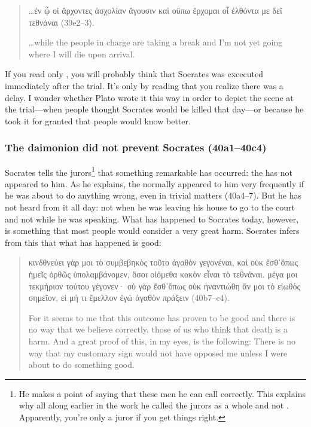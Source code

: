 \documentclass[11pt]{article}
\begin{document}
\begin{quote}
    \dots ἐν ᾧ οἱ ἄρχοντες ἀσχολίαν ἄγουσιν καὶ οὔπω ἔρχομαι οἷ ἐλθόντα με δεῖ τεθνάναι (39e2--3).

    \dots while the people in charge are taking a break and I'm not yet going where I will die upon arrival.
\end{quote}

If you read only , you will probably think that Socrates was excecuted immediately after the trial.  It's only by reading  that you realize there was a delay.  I wonder whether Plato wrote it this way in order to depict the scene at the trial---when people thought Socrates would be killed that day---or because he took it for granted that people would know better.

\subsubsection{The daimonion did not prevent Socrates (40a1--40c4)}

Socrates tells the jurors\footnote{He makes a point of saying that these men he can call  correctly.  This explains why all along earlier in the work he called the jurors as a whole  and not .  Apparently, you're only a juror if you get things right.} that something remarkable has occurred: the  has not appeared to him.  As he explains, the  normally appeared to him very frequently if he was about to do anything wrong, even in trivial matters (40a4--7).  But he has not heard from it all day: not when he was leaving his house to go to the court and not while he was speaking.  What has happened to Socrates today, however, is something that most people would consider a very great harm.  Socrates infers from this that what has happened is good:

\begin{quote}
    κινδθνεύει γὰρ μοι τὸ συμβεβηκὸς τοῦτο ἀγαθὸν γεγονέναι, καὶ οὐκ ἔσθ᾽ὅπως ἡμεῖς ὀρθῶς ὑπολαμβάνομεν, ὅσοι οἰόμεθα κακὸν εἶναι τὸ τεθνάναι. μέγα μοι τεκμήριον τούτου γέγονεν· οὐ γὰρ ἔσθ᾽ὅπως οὐκ ἠναντιώθη ἄν μοι τὸ εἰωθὸς σημεῖον, εἰ μή τι ἔμελλον ἐγώ ἀγαθὸν πράξειν (40b7--c4).

    For it seems to me that this outcome has proven to be good and there is no way that we believe correctly, those of us who think that death is a harm. And a great proof of this, in my eyes, is the following: There is no way that my customary sign would not have opposed me unless I were about to do something good.
\end{quote}
\end{document}
